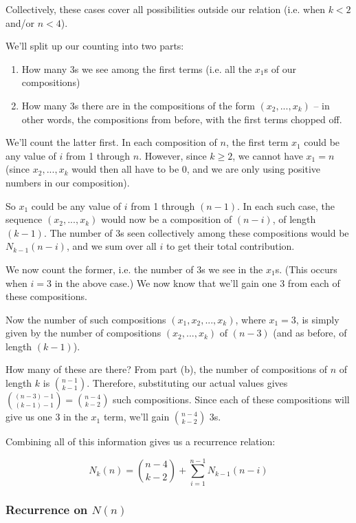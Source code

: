 Collectively, these cases cover all possibilities outside our relation (i.e. when $k < 2$ and/or $n < 4$). 


We'll split up our counting into two parts:
\begin{enumerate}
\item How many 3s we see among the first terms (i.e. all the $x_1$s of our compositions)
\item How many 3s there are in the compositions of the form $(x_2, ..., x_k)$ -- in other words, the compositions from before, with the first terms chopped off.
\end{enumerate}

We'll count the latter first. In each composition of $n$, the first term $x_1$ could be any value of $i$ from 1 through $n$. However, since $k \geq 2$, we cannot have $x_1 = n$ (since $x_2, ..., x_k$ would then all have to be 0, and we are only using positive numbers in our composition). 

So $x_1$ could be any value of $i$ from 1 through $(n-1)$. In each such case, the sequence $(x_2, ..., x_k)$ would now be a composition of $(n-i)$, of length $(k-1)$. The number of 3s seen collectively among these compositions would be $N_{k-1}(n-i)$, and we sum over all $i$ to get their total contribution.

We now count the former, i.e. the number of 3s we see in the $x_1$s. (This occurs when $i = 3$ in the above case.) We now know that we'll gain one 3 from each of these compositions. 

Now the number of such compositions $(x_1, x_2, ..., x_k)$, where $x_1 = 3$, is simply given by the number of compositions $(x_2, ..., x_k)$ of $(n-3)$ (and as before, of length $(k-1)$). 

How many of these are there? From part (b), the number of compositions of $n$ of length $k$ is $\binom{n-1}{k-1}$. Therefore, substituting our actual values gives $\binom{(n-3)-1}{(k-1)-1} = \binom{n-4}{k-2}$ such compositions. Since each of these compositions will give us one 3 in the $x_1$ term, we'll gain $\binom{n-4}{k-2}$ 3s.

Combining all of this information gives us a recurrence relation:

\begin{equation} 
\label{composition-num-3s-nk-recurrence}
N_k(n) = \binom{n-4}{k-2} + \sum_{i=1}^{n-1} N_{k-1}(n-i)
\end{equation}


\subsubsection{Recurrence on $N(n)$}

